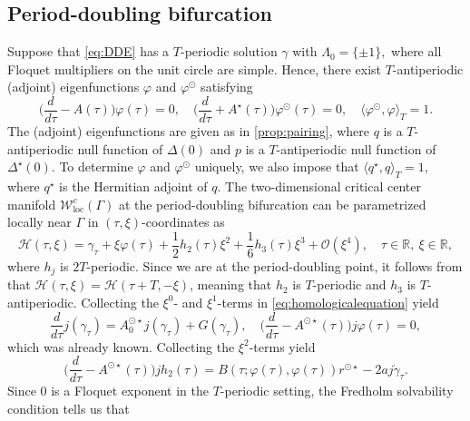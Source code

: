 \documentclass[english]{myarticle}
\DeclareMathOperator{\loc}{loc}
\begin{document}
\begin{sloppypar}
\subsection{Period-doubling bifurcation} \label{subsec:PD}
Suppose that \eqref{eq:DDE} has a $T$-periodic solution $\gamma$ with $\Lambda_0 = \{ \pm 1 \},$ where all Floquet multipliers on the unit circle are simple. Hence, there exist $T$-antiperiodic (adjoint) eigenfunctions $\varphi$ and $\varphi^\odot$ satisfying
\begin{equation*} 
    \bigg( \frac{d}{d\tau} - A(\tau)\bigg)\varphi(\tau)=
    0, \quad \bigg( \frac{d}{d\tau} + A^\star(\tau)\bigg)\varphi^\odot(\tau)=0, \quad \langle \varphi^\odot, \varphi \rangle_T = 1.
\end{equation*}
The (adjoint) eigenfunctions are given as in \cref{prop:pairing}, where $q$ is a $T$-antiperiodic null function of $\Delta(0)$ and $p$ is a $T$-antiperiodic null function of $\Delta^\star(0)$. To determine  $\varphi$ and $\varphi^\odot$ uniquely, we also impose that $\langle q^{\star},q \rangle_T = 1$, where $q^\star$ is the Hermitian adjoint of $q$. The two-dimensional critical center manifold $\mathcal{W}_{\loc}^{c}(\Gamma)$ at the period-doubling bifurcation can be parametrized locally near $\Gamma$ in $(\tau,\xi)$-coordinates as
\begin{equation} \label{eq:H of PD}
    \mathcal{H}(\tau,\xi) = \gamma_\tau + \xi \varphi(\tau) + \frac{1}{2}h_2(\tau) \xi^2 + \frac{1}{6}h_3(\tau) \xi^3 + \mathcal{O}(\xi^4), \quad \tau \in \mathbb{R}, \ \xi \in \mathbb{R},
\end{equation}
where $h_j$ is $2T$-periodic. Since we are at the period-doubling point, it follows from \cite[Theorem 12]{Article1} that $\mathcal{H}(\tau,\xi) = \mathcal{H}(\tau+T,-\xi)$, meaning that $h_2$ is $T$-periodic and $h_3$ is $T$-antiperiodic. Collecting the $\xi^0$- and $\xi^1$-terms in \eqref{eq:homologicalequation} yield
\begin{equation*}
    \frac{d}{d\tau} j(\gamma_\tau) = A_0^{\odot \star} j(\gamma_\tau) + G(\gamma_\tau), \quad \bigg(\frac{d}{d \tau} - A^{\odot \star}(\tau) \bigg)j\varphi(\tau) = 0,
\end{equation*}
which was already known. Collecting the $\xi^2$-terms yield 
\begin{equation} \label{eq:PDxi^2terms}
    \bigg(\frac{d}{d \tau} - A^{\odot \star}(\tau) \bigg) jh_2(\tau) = B(\tau;\varphi(\tau),\varphi(\tau))r^{\odot \star} - 2aj\dot{\gamma}_\tau.
\end{equation}
Since $0$ is a Floquet exponent in the $T$-periodic setting, the Fredholm solvability condition tells us that

\end{sloppypar}
\end{document}
